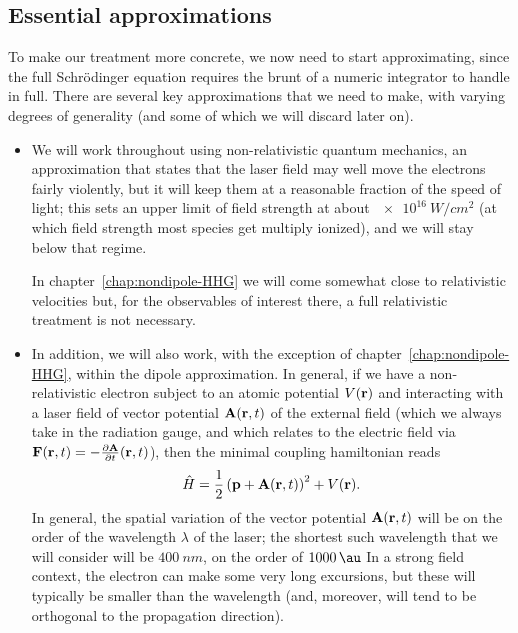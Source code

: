 \subsection{Essential approximations}

To make our treatment more concrete, we now need to start approximating, since the full Schrödinger equation requires the brunt of a numeric integrator to handle in full. There are several key approximations that we need to make, with varying degrees of generality (and some of which we will discard later on).

\begin{itemize}
\item We will work throughout using non-relativistic quantum mechanics, an approximation that states that the laser field may well move the electrons fairly violently, but it will keep them at a reasonable fraction of the speed of light; this sets an upper limit of field strength at about $\SI{e16}{W/cm^2}$ (at which field strength most species get multiply ionized), and we will stay below that regime. 

In chapter~\ref{chap:nondipole-HHG} we will come somewhat close to relativistic velocities but, for the observables of interest there, a full relativistic treatment is not necessary.

\item In addition, we will also work, with the exception of chapter~\ref{chap:nondipole-HHG}, within the dipole approximation. In general, if we have a non-relativistic electron subject to an atomic potential $V(\vb{r})$ and interacting with a laser field of vector potential $\vb{A}(\vb{r},t)$ of the external field (which we always take in the radiation gauge, and which relates to the electric field via $\vb{F}(\vb{r},t)=-\frac{\partial \vb{A}}{\partial t}(\vb{r},t)$), then the minimal coupling hamiltonian reads
\begin{equation}
\hat H = \frac{1}{2} \left(\vb{p} +\vb{A}(\vb{r},t)\right)^2 + V(\vb{r}).
\end{equation}
In general, the spatial variation of the vector potential $\vb{A}(\vb{r},t)$ will be on the order of the wavelength $\lambda$ of the laser; the shortest such wavelength that we will consider will be $\SI{400}{nm}$, on the order of $\SI{1000}{\au}$ In a strong field context, the electron can make some very long excursions, but these will typically be smaller than the wavelength (and, moreover, will tend to be orthogonal to the propagation direction). 



\end{itemize}
